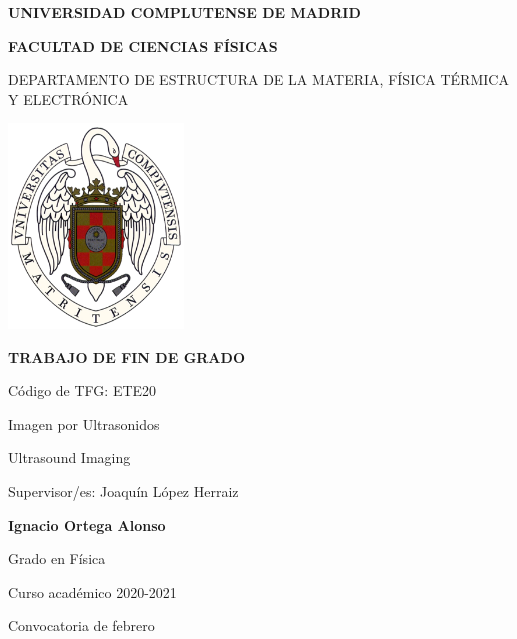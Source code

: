 \documentclass[11pt]{article} %
\begin{document}
\begin{titlepage}
\centering
{ \bfseries \Large UNIVERSIDAD COMPLUTENSE DE MADRID}
\vspace{0.5cm}

{\bfseries  \Large FACULTAD DE CIENCIAS FÍSICAS} 
\vspace{1cm}

{\large DEPARTAMENTO DE ESTRUCTURA DE LA MATERIA, FÍSICA TÉRMICA Y ELECTRÓNICA}
\vspace{0.8cm}

{\includegraphics[width=0.35\textwidth]{figuras/logoUCM.png}} %
\vspace{0.8cm}

{\bfseries \Large TRABAJO DE FIN DE GRADO}
\vspace{15mm}

{\Large Código de TFG:  ETE20 } \vspace{5mm}

{\Large Imagen por Ultrasonidos}\vspace{5mm}

{\Large Ultrasound Imaging}\vspace{5mm}

{\Large Supervisor/es: Joaquín López Herraiz}\vspace{18mm} 

{\bfseries \LARGE Ignacio Ortega Alonso}\vspace{5mm} 

{\large Grado en Física}\vspace{5mm} 

{\large Curso acad\'emico 2020-2021}\vspace{5mm} 

{\large Convocatoria de febrero}\vspace{5mm} 

\end{titlepage}
\newpage
\end{document}
